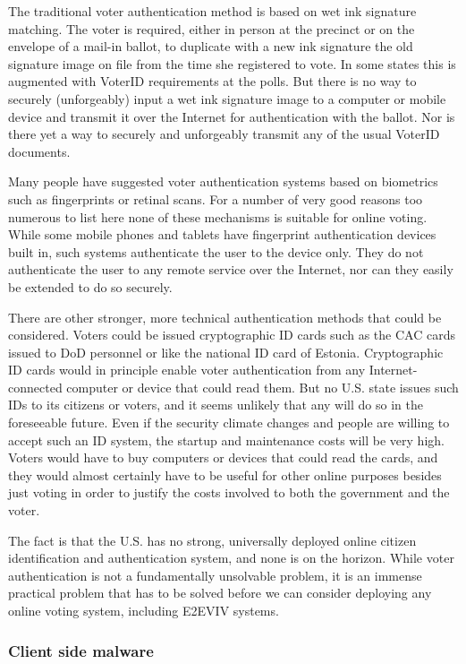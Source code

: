 The traditional voter authentication method is based on wet ink
signature matching. The voter is required, either in person at the
precinct or on the envelope of a mail-in ballot, to duplicate with a
new ink signature the old signature image on file from the time she
registered to vote. In some states this is augmented with VoterID
requirements at the polls. But there is no way to securely
(unforgeably) input a wet ink signature image to a computer or mobile
device and transmit it over the Internet for authentication with the
ballot. Nor is there yet a way to securely and unforgeably transmit
any of the usual VoterID documents.

Many people have suggested voter authentication systems based on
biometrics such as fingerprints or retinal scans. For a number of very
good reasons too numerous to list here none of these mechanisms is
suitable for online voting. While some mobile phones and tablets have
fingerprint authentication devices built in, such systems authenticate
the user to the device only. They do not authenticate the user to any
remote service over the Internet, nor can they easily be extended to
do so securely.

There are other stronger, more technical authentication methods that
could be considered.  Voters could be issued cryptographic ID cards
such as the CAC cards issued to DoD personnel or like the national ID
card of Estonia. Cryptographic ID cards would in principle enable
voter authentication from any Internet-connected computer or device
that could read them. But no U.S. state issues such IDs to its
citizens or voters, and it seems unlikely that any will do so in the
foreseeable future. Even if the security climate changes and people
are willing to accept such an ID system, the startup and maintenance
costs will be very high.  Voters would have to buy computers or
devices that could read the cards, and they would almost certainly
have to be useful for other online purposes besides just voting in
order to justify the costs involved to both the government and the
voter.

The fact is that the U.S. has no strong, universally deployed online
citizen identification and authentication system, and none is on the
horizon. While voter authentication is not a fundamentally unsolvable
problem, it is an immense practical problem that has to be solved
before we can consider deploying any online voting system, including
E2EVIV systems.

\subsubsection{Client side malware}

